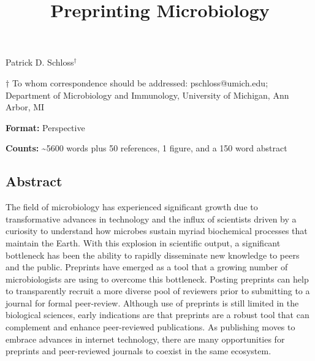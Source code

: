 \documentclass[11pt,]{article}
\title{\textbf{Preprinting Microbiology}}
\author{}
\date{}
\begin{document}
\maketitle

\begin{center}
\vspace{25mm}
Patrick D. Schloss${^\dagger}$

\vspace{30mm}

$\dagger$ To whom correspondence should be addressed: pschloss@umich.edu; Department of Microbiology and Immunology, University of Michigan, Ann Arbor, MI

\vspace{10mm}

\textbf{Format:} Perspective

\textbf{Counts:} \textasciitilde5600 words plus 50 references, 1 figure, and a 150 word abstract

\end{center}

\newpage

\linenumbers

\subsection{Abstract}\label{abstract}

The field of microbiology has experienced significant growth due to
transformative advances in technology and the influx of scientists
driven by a curiosity to understand how microbes sustain myriad
biochemical processes that maintain the Earth. With this explosion in
scientific output, a significant bottleneck has been the ability to
rapidly disseminate new knowledge to peers and the public. Preprints
have emerged as a tool that a growing number of microbiologists are
using to overcome this bottleneck. Posting preprints can help to
transparently recruit a more diverse pool of reviewers prior to
submitting to a journal for formal peer-review. Although use of
preprints is still limited in the biological sciences, early indications
are that preprints are a robust tool that can complement and enhance
peer-reviewed publications. As publishing moves to embrace advances in
internet technology, there are many opportunities for preprints and
peer-reviewed journals to coexist in the same ecosystem.

\newpage
\end{document}
